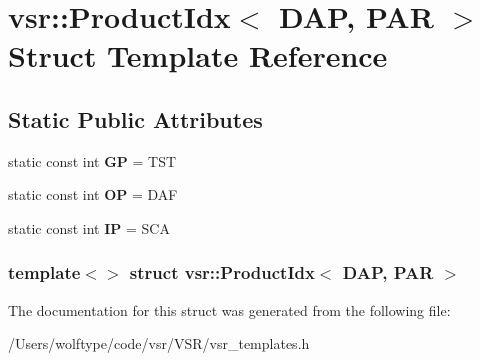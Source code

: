 \hypertarget{structvsr_1_1_product_idx_3_01_d_a_p_00_01_p_a_r_01_4}{\section{vsr\-:\-:Product\-Idx$<$ D\-A\-P, P\-A\-R $>$ Struct Template Reference}
\label{structvsr_1_1_product_idx_3_01_d_a_p_00_01_p_a_r_01_4}
}
\subsection*{Static Public Attributes}
\begin{DoxyCompactItemize}
\item 
\hypertarget{structvsr_1_1_product_idx_3_01_d_a_p_00_01_p_a_r_01_4_ae6197b9026230f697df488d082b06717}{static const int {\bfseries G\-P} = T\-S\-T}\label{structvsr_1_1_product_idx_3_01_d_a_p_00_01_p_a_r_01_4_ae6197b9026230f697df488d082b06717}

\item 
\hypertarget{structvsr_1_1_product_idx_3_01_d_a_p_00_01_p_a_r_01_4_a5e2e48ce222d7889052d7cbbce64dbfe}{static const int {\bfseries O\-P} = D\-A\-F}\label{structvsr_1_1_product_idx_3_01_d_a_p_00_01_p_a_r_01_4_a5e2e48ce222d7889052d7cbbce64dbfe}

\item 
\hypertarget{structvsr_1_1_product_idx_3_01_d_a_p_00_01_p_a_r_01_4_a3562d95da56ace7a2c90fa323f1711e0}{static const int {\bfseries I\-P} = S\-C\-A}\label{structvsr_1_1_product_idx_3_01_d_a_p_00_01_p_a_r_01_4_a3562d95da56ace7a2c90fa323f1711e0}

\end{DoxyCompactItemize}
\subsubsection*{template$<$$>$ struct vsr\-::\-Product\-Idx$<$ D\-A\-P, P\-A\-R $>$}



The documentation for this struct was generated from the following file\-:\begin{DoxyCompactItemize}
\item 
/\-Users/wolftype/code/vsr/\-V\-S\-R/vsr\-\_\-templates.\-h\end{DoxyCompactItemize}
